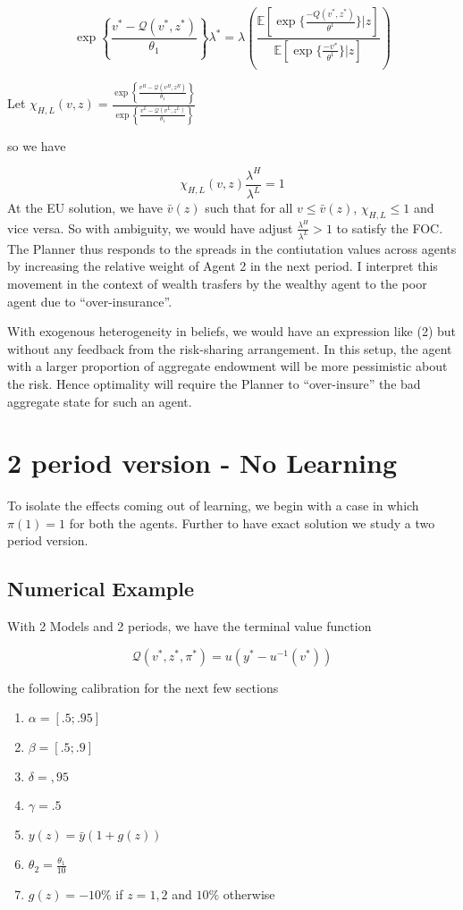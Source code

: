 \documentclass[12pt]{article}
\begin{document}
\[\exp\left\{\frac{v^*-\mathcal{Q}(v^*,z^*)}{\theta_1}\right\}\lambda^* =\lambda 
\left(\frac
{\mathbb{E}\left[\exp\{\frac{-Q(v^*,z^*)}{\theta^1}\} | z\right]}
{\mathbb{E}\left[\exp\{\frac{-v^*}{\theta^1}\} | z\right]}
\right)
\]

\noindent Let $\chi_{H,L}(v,z) = \frac{\exp\left\{\frac{v^{H}-\mathcal{Q}(v^{H},z^{H})}{\theta_1}\right\}}{\exp\left\{\frac{v^{L}-\mathcal{Q}(v^{L},z^{L})}{\theta_1}\right\}}$

\noindent so we have

\[\chi_{H,L}(v,z) \frac{\lambda^{H}}{\lambda^{L}}=1\]
At the EU solution, we have $\bar{v}(z)$ such that for all $v \leq \bar{v}(z)$, $\chi_{H,L}\leq 1$ and vice versa. So with ambiguity, we would have adjust $\frac{\lambda^{H}}{\lambda^{L}} > 1$ to satisfy the FOC. The Planner thus responds to the  spreads in the contiutation values across agents by increasing the relative weight of Agent 2 in the next period. I interpret this movement in the context of wealth trasfers by the wealthy agent to the poor agent due to ``over-insurance''.

\noindent With exogenous heterogeneity in beliefs, we would have an expression like (2) but without any feedback from the risk-sharing arrangement. In this setup, the agent with a larger proportion of aggregate endowment will be more pessimistic about the risk. Hence optimality will require the Planner to ``over-insure'' the bad aggregate state for such an agent.

 

\section{2 period version - No Learning}
To isolate the effects coming out of learning, we begin with a case in which $\pi(1)=1$ for both the agents. Further to have exact solution we study a two period version. 
\subsection{Numerical Example}

With 2 Models and 2 periods, we have the terminal value function

\[\mathcal{Q}(v^*,z^*,\pi^*) = u(y^*-u^{-1}(v^*))\]

the following calibration for the next few sections

\begin{enumerate}
	\item $\alpha =[ .5;.95]$
	\item $\beta=[.5;.9]$
	\item $\delta=,95$
	\item $\gamma=.5$
	\item $y(z)=\bar{y}(1+g(z))$
	\item $\theta_2=\frac{\theta_1}{10}$
	\item $g(z)=-10\%$ if $z=1,2$ and $10\%$ otherwise
\end{enumerate}
\end{document}
